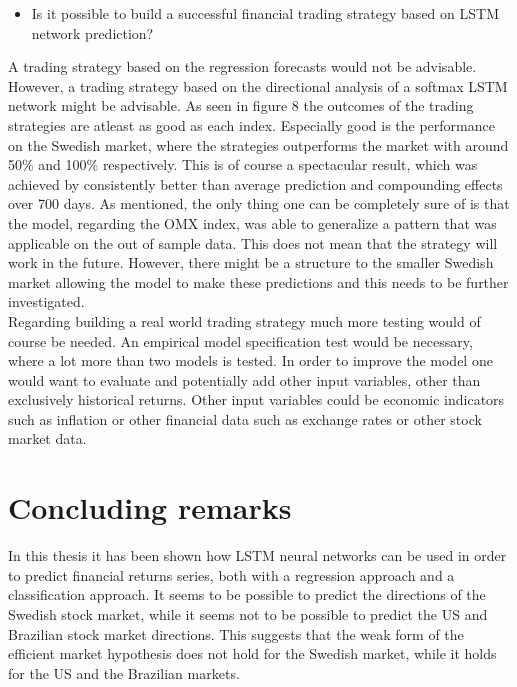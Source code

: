 \documentclass[12pt, letterpaper]{amsart}%
\begin{document}
\begin{itemize}
\item Is it possible to build a successful financial trading strategy based on LSTM network prediction?
\end{itemize}
\vspace{0.5cm}

A trading strategy based on the regression forecasts would not be advisable. However, a trading strategy based on the directional analysis of a softmax LSTM network might be advisable. As seen in figure 8 the outcomes of the trading strategies are atleast as good as each index. Especially good is the performance on the Swedish market, where the strategies outperforms the market with around 50\% and 100\% respectively. This is of course a spectacular result, which was achieved by consistently better than average prediction and compounding effects over 700 days. As mentioned, the only thing one can be completely sure of is that the model, regarding the OMX index, was able to generalize a pattern that was applicable on the out of sample data. This does not mean that the strategy will work in the future. However, there might be a structure to the smaller Swedish market allowing the model to make these predictions and this needs to be further investigated.
\\

Regarding building a real world trading strategy much more testing would of course be needed. An empirical model specification test would be necessary, where a lot more than two models is tested. In order to improve the model one would want to evaluate and potentially add other input variables, other than exclusively historical returns. Other input variables could be economic indicators such as inflation or other financial data such as exchange rates or other stock market data.

\section{Concluding remarks}
In this thesis it has been shown how LSTM neural networks can be used in order to predict financial returns series, both with a regression approach and a classification approach. It seems to be possible to predict the directions of the Swedish stock market, while it seems not to be possible to predict the US and Brazilian stock market directions. This suggests that the weak form of the efficient market hypothesis does not hold for the Swedish market, while it holds for the US and the Brazilian markets.
\\
\end{document}

